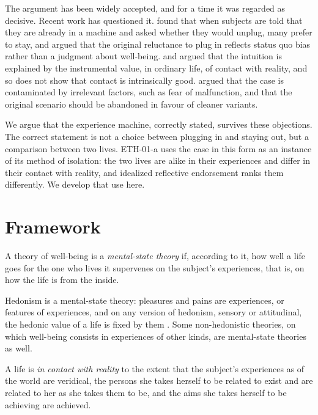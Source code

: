 \documentclass{situationist-preprint}
\begin{document}
The argument has been widely accepted, and for a time it was regarded as decisive. Recent work has questioned it. \citet{deBrigard2010} found that when subjects are told that they are already in a machine and asked whether they would unplug, many prefer to stay, and argued that the original reluctance to plug in reflects status quo bias rather than a judgment about well-being. \citet{Silverstein2000} and \citet{Crisp2006} argued that the intuition is explained by the instrumental value, in ordinary life, of contact with reality, and so does not show that contact is intrinsically good. \citet{Weijers2014} argued that the case is contaminated by irrelevant factors, such as fear of malfunction, and that the original scenario should be abandoned in favour of cleaner variants.

We argue that the experience machine, correctly stated, survives these objections. The correct statement is not a choice between plugging in and staying out, but a comparison between two lives. ETH-01-a uses the case in this form as an instance of its method of isolation: the two lives are alike in their experiences and differ in their contact with reality, and idealized reflective endorsement ranks them differently. We develop that use here.

\section{Framework}

\begin{definition}\label{d:mst}
A theory of well-being is a \emph{mental-state theory} if, according to it, how well a life goes for the one who lives it supervenes on the subject's experiences, that is, on how the life is from the inside.
\end{definition}

Hedonism is a mental-state theory: pleasures and pains are experiences, or features of experiences, and on any version of hedonism, sensory or attitudinal, the hedonic value of a life is fixed by them \citep{Feldman2004}. Some non-hedonistic theories, on which well-being consists in experiences of other kinds, are mental-state theories as well.

\begin{definition}\label{d:contact}
A life is \emph{in contact with reality} to the extent that the subject's experiences as of the world are veridical, the persons she takes herself to be related to exist and are related to her as she takes them to be, and the aims she takes herself to be achieving are achieved.
\end{definition}
\end{document}
